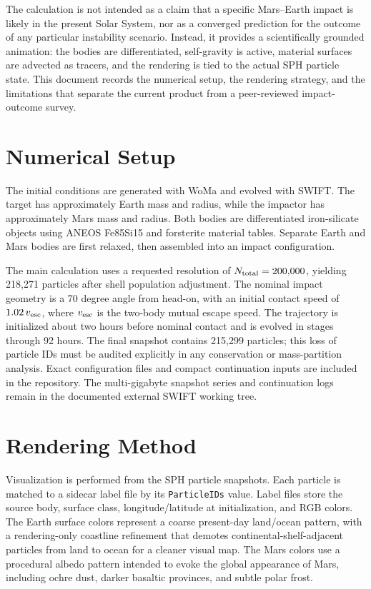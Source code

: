 \documentclass[twocolumn]{aastex631}
\begin{document}
The calculation is not intended as a claim that a specific Mars--Earth impact
is likely in the present Solar System, nor as a converged prediction for the
outcome of any particular instability scenario.  Instead, it provides a
scientifically grounded animation: the bodies are differentiated, self-gravity
is active, material surfaces are advected as tracers, and the rendering is tied
to the actual SPH particle state.  This document records the numerical setup,
the rendering strategy, and the limitations that separate the current product
from a peer-reviewed impact-outcome survey.

\section{Numerical Setup}

The initial conditions are generated with WoMa and evolved with SWIFT.  The
target has approximately Earth mass and radius, while the impactor has
approximately Mars mass and radius.  Both bodies are differentiated
iron-silicate objects using ANEOS Fe85Si15 and forsterite material tables.
Separate Earth and Mars bodies are first relaxed, then assembled into an impact
configuration.

The main calculation uses a requested resolution of
$N_{\rm total}=200{,}000$, yielding 218,271 particles after shell population
adjustment.  The nominal impact geometry is a 70 degree angle from head-on, with
an initial contact speed of $1.02\,v_{\rm esc}$, where $v_{\rm esc}$ is the
two-body mutual escape speed.  The trajectory is initialized about two hours
before nominal contact and is evolved in stages through 92 hours.  The final
snapshot contains 215,299 particles; this loss of particle IDs must be audited
explicitly in any conservation or mass-partition analysis.  Exact configuration
files and compact continuation inputs are included in the repository.  The
multi-gigabyte snapshot series and continuation logs remain in the documented
external SWIFT working tree.

\section{Rendering Method}

Visualization is performed from the SPH particle snapshots.  Each particle is
matched to a sidecar label file by its \texttt{ParticleIDs} value.  Label files
store the source body, surface class, longitude/latitude at initialization, and
RGB colors.  The Earth surface colors represent a coarse present-day
land/ocean pattern, with a rendering-only coastline refinement that demotes
continental-shelf-adjacent particles from land to ocean for a cleaner visual
map.  The Mars colors use a procedural albedo pattern intended to evoke the
global appearance of Mars, including ochre dust, darker basaltic provinces, and
subtle polar frost.
\end{document}
